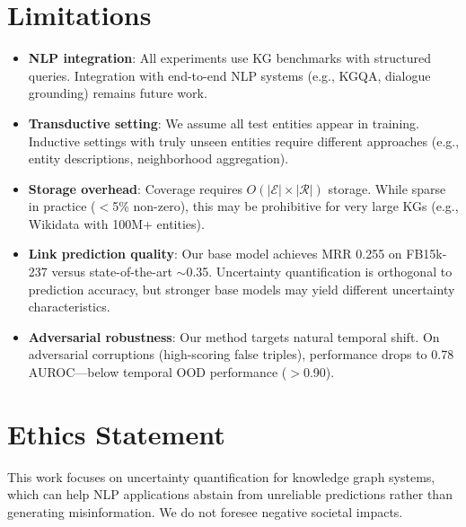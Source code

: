 \documentclass[11pt]{article}
\begin{document}
\section*{Limitations}
\begin{itemize}
    \item \textbf{NLP integration}: All experiments use KG benchmarks with structured queries. Integration with end-to-end NLP systems (e.g., KGQA, dialogue grounding) remains future work.
    \item \textbf{Transductive setting}: We assume all test entities appear in training. Inductive settings with truly unseen entities require different approaches (e.g., entity descriptions, neighborhood aggregation).
    \item \textbf{Storage overhead}: Coverage requires $O(|\mathcal{E}| \times |\mathcal{R}|)$ storage. While sparse in practice ($<$5\% non-zero), this may be prohibitive for very large KGs (e.g., Wikidata with 100M+ entities).
    \item \textbf{Link prediction quality}: Our base model achieves MRR 0.255 on FB15k-237 versus state-of-the-art $\sim$0.35. Uncertainty quantification is orthogonal to prediction accuracy, but stronger base models may yield different uncertainty characteristics.
    \item \textbf{Adversarial robustness}: Our method targets natural temporal shift. On adversarial corruptions (high-scoring false triples), performance drops to 0.78 AUROC---below temporal OOD performance ($>$0.90).
\end{itemize}

\section*{Ethics Statement}
This work focuses on uncertainty quantification for knowledge graph systems, which can help NLP applications abstain from unreliable predictions rather than generating misinformation. We do not foresee negative societal impacts.



\appendix

\end{document}
